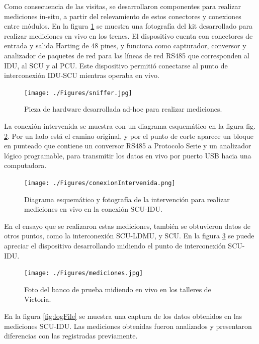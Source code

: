 Como consecuencia de las visitas, se desarrollaron componentes para realizar mediciones in-situ, a partir del relevamiento de estos conectores y conexiones entre módulos. En la figura \ref{fig:sniffer} se muestra una fotografía del kit desarrollado para realizar mediciones en vivo en los trenes. El dispositivo cuenta con conectores de entrada y salida Harting de 48 pines, y funciona como capturador, conversor y analizador de paquetes de red para las líneas de red RS485 que corresponden al IDU, al SCU y al PCU. Este dispositivo permitió conectarse al punto de interconexión IDU-SCU mientras operaba en vivo.\\


\begin{figure}[H]
	\centering
	\texttt{[image: ./Figures/sniffer.jpg]}
	\caption{Pieza de hardware desarrollada ad-hoc para realizar mediciones.}
	\label{fig:sniffer}
\end{figure}

 La conexión intervenida se muestra con un diagrama esquemático en la figura fig. \ref{fig:conexionIntervenida}. Por un lado está el camino original, y por el punto de corte aparece un bloque en punteado que contiene un conversor RS485 a Protocolo Serie y un analizador lógico programable, para transmitir los datos en vivo por puerto USB hacia una computadora.\\

\begin{figure}[H]
	\centering
      \texttt{[image: ./Figures/conexionIntervenida.png]}
	\caption{Diagrama esquemático y fotografía de la intervención para realizar mediciones en vivo en la conexión SCU-IDU.}
	\label{fig:conexionIntervenida}
\end{figure}

En el ensayo que se realizaron estas mediciones, también se obtuvieron datos de otros puntos, como la interconexión SCU-LDMU, y SCU. En la figura \ref{fig:mediciones} se puede apreciar el dispositivo desarrollando midiendo el punto de interconexión SCU-IDU. \\

 \begin{figure}[H]
	\centering
	\texttt{[image: ./Figures/mediciones.jpg]}
	\caption{Foto del banco de prueba midiendo en vivo en los talleres de Victoria.}
	\label{fig:mediciones}
\end{figure}

En la figura \ref{fig:logFile} se muestra una captura de los datos obtenidos en las mediciones SCU-IDU. Las mediciones obtenidas fueron analizados y presentaron diferencias con las registradas previamente.\\

